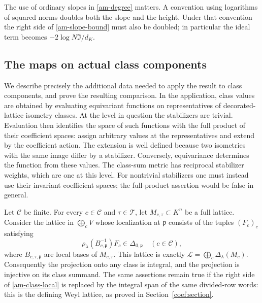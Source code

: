 The use of ordinary slopes in \eqref{am-degree} matters. A convention
using logarithms of squared norms doubles both the slope and the height.
Under that convention the right side of \eqref{am-slope-bound} must
also be doubled; in particular the ideal term becomes
$-2\log N\mathfrak I/d_K$.

\subsection{The maps on actual class components}

We describe precisely the additional data needed to apply the result
to class components, and prove the resulting comparison.
In the application, class values are obtained by evaluating equivariant
functions on representatives of decorated-lattice isometry classes.
At the level in question the stabilizers are trivial. Evaluation then
identifies the space of such functions with the full product of their
coefficient spaces: assign arbitrary values at the representatives and
extend by the coefficient action. The extension is well defined because
two isometries with the same image differ by a stabilizer. Conversely,
equivariance determines the function from these values. The class-sum
metric has reciprocal stabilizer weights, which are one at this level.
For nontrivial stabilizers one must instead use their invariant
coefficient spaces; the full-product assertion would be false in general.

Let $\mathcal C$ be finite. For every $c\in\mathcal C$ and
$\tau\in\mathcal T$, let $M_{c,\tau}\subset K^n$ be a full lattice.
Consider the lattice in $\bigoplus_cV$ whose localization at
$\mathfrak p$ consists of the tuples $(F_c)_c$ satisfying
\begin{equation}\label{am-class-local}
 \rho_\lambda(B_{c,\mathfrak p}^{-1})F_c
                               \in\Delta_{0,\mathfrak p}\quad(c\in\mathcal C),
\end{equation}
where $B_{c,\tau,\mathfrak p}$ are local bases of $M_{c,\tau}$.
This lattice is exactly
$\mathcal L=\bigoplus_c\Delta_\lambda(M_c)$.
Consequently the projection onto any class is integral, and the
projection is injective on its class summand. The same assertions
remain true if the right side of \eqref{am-class-local} is replaced by
the integral span of the same divided-row words: this is the defining
Weyl lattice, as proved in Section~\ref{coef:section}.

